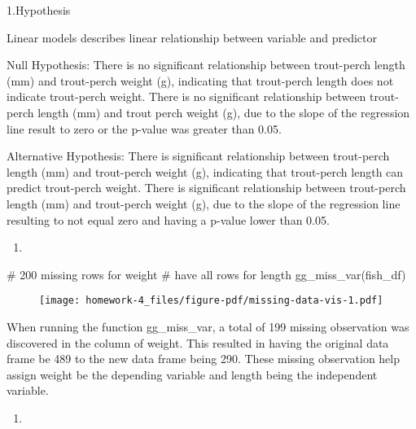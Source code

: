 \documentclass[
  letterpaper,
  DIV=11,
  numbers=noendperiod]{scrartcl}
\newenvironment{Shaded}{\begin{snugshade}}{\end{snugshade}}
\newcommand{\CommentTok}[1]{\textcolor[rgb]{0.37,0.37,0.37}{#1}}
\newcommand{\FunctionTok}[1]{\textcolor[rgb]{0.28,0.35,0.67}{#1}}
\newcommand{\NormalTok}[1]{\textcolor[rgb]{0.00,0.23,0.31}{#1}}
\providecommand{\tightlist}{%
  \setlength{\itemsep}{0pt}\setlength{\parskip}{0pt}}\usepackage{longtable,booktabs,array}
\begin{document}
1.Hypothesis

Linear models describes linear relationship between variable and
predictor

Null Hypothesis: There is no significant relationship between
trout-perch length (mm) and trout-perch weight (g), indicating that
trout-perch length does not indicate trout-perch weight. There is no
significant relationship between trout-perch length (mm) and trout perch
weight (g), due to the slope of the regression line result to zero or
the p-value was greater than 0.05.

Alternative Hypothesis: There is significant relationship between
trout-perch length (mm) and trout-perch weight (g), indicating that
trout-perch length can predict trout-perch weight. There is significant
relationship between trout-perch length (mm) and trout-perch weight (g),
due to the slope of the regression line resulting to not equal zero and
having a p-value lower than 0.05.

\begin{enumerate}
\def\labelenumi{\arabic{enumi}.}
\setcounter{enumi}{1}
\tightlist
\item
\end{enumerate}

\begin{Shaded}
\begin{Highlighting}[]
\CommentTok{\# 200 missing rows for weight}
\CommentTok{\# have all rows for length }
\FunctionTok{gg\_miss\_var}\NormalTok{(fish\_df) }
\end{Highlighting}
\end{Shaded}

\begin{figure}[H]

{\centering \texttt{[image: homework-4\_files/figure-pdf/missing-data-vis-1.pdf]}

}

\end{figure}

When running the function gg\_miss\_var, a total of 199 missing
observation was discovered in the column of weight. This resulted in
having the original data frame be 489 to the new data frame being 290.
These missing observation help assign weight be the depending variable
and length being the independent variable.

\begin{enumerate}
\def\labelenumi{\arabic{enumi}.}
\setcounter{enumi}{2}
\tightlist
\item
\end{enumerate}
\end{document}
